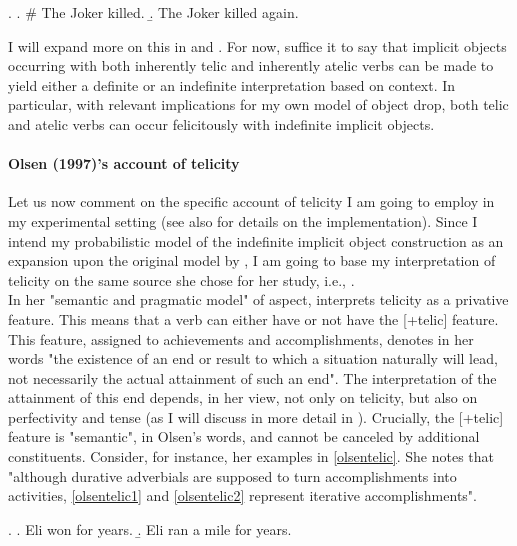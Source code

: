 \ex. \label{goldbergtelic} \a. \label{goldbergtelic1} \# The Joker killed.
\b. \label{goldbergtelic2} The Joker killed again.

I will expand more on this in  and . For now, suffice it to say that implicit objects occurring with both inherently telic and inherently atelic verbs can be made to yield either a definite or an indefinite interpretation based on context. In particular, with relevant implications for my own model of object drop, both telic and atelic verbs can occur felicitously with indefinite implicit objects.

\paragraph{Olsen (1997)'s account of telicity}
Let us now comment on the specific account of telicity I am going to employ in my experimental setting (see also  for details on the implementation). Since I intend my probabilistic model of the indefinite implicit object construction as an expansion upon the original model by \textcite{Medina2007}, I am going to base my interpretation of telicity on the same source she chose for her study, i.e., \textcite{Olsen1997}.\\
In her "semantic and pragmatic model" of aspect, \textcite{Olsen1997} interprets telicity as a privative feature. This means that a verb can either have or not have the [+telic] feature. This feature, assigned to achievements and accomplishments, denotes in her words "the existence of an end or result to which a situation naturally will lead, not necessarily the actual attainment of such an end". The interpretation of the attainment of this end depends, in her view, not only on telicity, but also on perfectivity and tense (as I will discuss in more detail in ). Crucially, the [+telic] feature is "semantic", in Olsen's words, and cannot be canceled by additional constituents. Consider, for instance, her examples in \ref{olsentelic}. She notes that "although durative adverbials are supposed to turn accomplishments into activities, \ref{olsentelic1} and \ref{olsentelic2} represent iterative accomplishments".

\ex. \label{olsentelic} \a. \label{olsentelic1} Eli won for years.
\b. \label{olsentelic2} Eli ran a mile for years.

